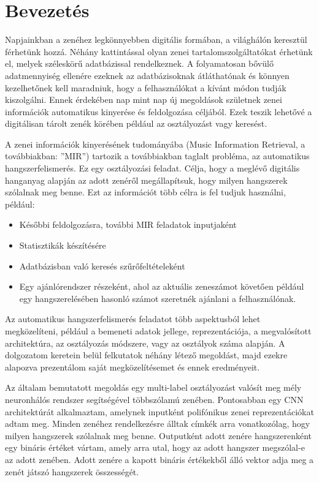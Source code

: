 \chapter{Bevezetés} %
\label{ch:intro}

Napjainkban a zenéhez legkönnyebben digitális formában, a világhálón keresztül férhetünk hozzá. Néhány kattintással olyan zenei tartalomszolgáltatókat érhetünk el, melyek széleskörű adatbázissal rendelkeznek. A folyamatosan bővülő adatmennyiség ellenére ezeknek az adatbázisoknak átláthatónak és könnyen kezelhetőnek kell maradniuk, hogy a felhasználókat a kívánt módon tudják kiszolgálni. Ennek érdekében nap mint nap új  megoldások születnek zenei információk automatikus kinyerése és feldolgozása céljából. Ezek teszik lehetővé a digitálisan tárolt zenék körében például az osztályozást vagy keresést.

A zenei információk kinyerésének tudományába (Music Information Retrieval, a továbbiakban: ''MIR'') tartozik a továbbiakban taglalt probléma, az automatikus hangszerfelismerés. Ez egy osztályozási feladat. Célja, hogy a meglévő digitális hanganyag alapján az adott zenéről megállapítsuk, hogy milyen hangszerek szólalnak meg benne. Ezt az információt több célra is fel tudjuk használni, például:
\begin{itemize}
 \item Későbbi feldolgozásra, további MIR feladatok inputjaként
 \item Statisztikák készítésére
 \item Adatbázisban való keresés szűrőfeltételeként
 \item Egy ajánlórendszer részeként, ahol az aktuális zeneszámot követően például egy hangszerelésében hasonló számot szeretnék ajánlani a felhasználónak.
\end{itemize}

Az automatikus hangszerfelismerés feladatot több aspektusból lehet megközelíteni, például a bemeneti adatok jellege, reprezentációja, a megvalósított architektúra, az osztályozás módszere, vagy az osztályok száma alapján. A dolgozatom keretein belül felkutatok néhány létező megoldást, majd ezekre alapozva prezentálom saját megközelítésemet és ennek eredményeit.

Az általam bemutatott megoldás egy multi-label osztályozást valósít meg mély neuronhálós rendszer segítségével többszólamú zenében. Pontosabban egy CNN architektúrát alkalmaztam, amelynek inputként polifónikus zenei reprezentációkat adtam meg. Minden zenéhez rendelkezésre álltak címkék arra vonatkozólag, hogy milyen hangszerek szólalnak meg benne. Outputként adott zenére hangszerenként egy bináris értéket vártam, amely arra utal, hogy az adott hangszer megszólal-e az adott zenében. Adott zenére a kapott bináris értékekből álló vektor adja meg a zenét játszó hangszerek összességét.

